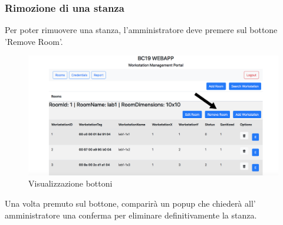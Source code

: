 \subsubsection{Rimozione di una stanza}
Per poter rimuovere una stanza, l'amministratore deve premere sul bottone 'Remove Room'.
\begin{figure}[H]
	\centering
	\includegraphics[width=15cm]{res/images/bottoneRemoveRoom.png}
	\caption{Visualizzazione bottoni}
\end{figure}
Una volta premuto sul bottone, comparirà un popup che chiederà all' amministratore una conferma per eliminare definitivamente la stanza.

